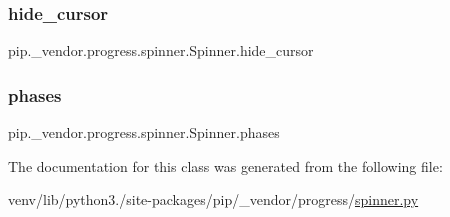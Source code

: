 \subsubsection{\texorpdfstring{hide\+\_\+cursor}{hide\_cursor}}
{\footnotesize\ttfamily pip.\+\_\+vendor.\+progress.\+spinner.\+Spinner.\+hide\+\_\+cursor\hspace{0.3cm}{\ttfamily [static]}}

\mbox{\label{classpip_1_1__vendor_1_1progress_1_1spinner_1_1Spinner_a7f4cec389f5cad29f24ca4547f0f177e}} 
\subsubsection{\texorpdfstring{phases}{phases}}
{\footnotesize\ttfamily pip.\+\_\+vendor.\+progress.\+spinner.\+Spinner.\+phases\hspace{0.3cm}{\ttfamily [static]}}



The documentation for this class was generated from the following file\+:\begin{DoxyCompactItemize}
\item 
venv/lib/python3./site-\/packages/pip/\+\_\+vendor/progress/\hyperlink{spinner_8py}{spinner.\+py}\end{DoxyCompactItemize}
